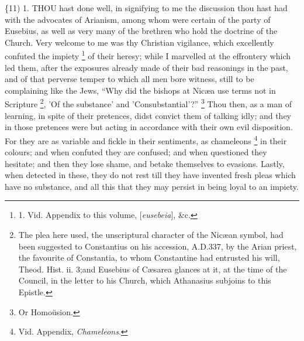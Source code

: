 \{11) 1. THOU
hast done well, in signifying to me the discussion thou hast had with
the advocates of Arianism, among whom were certain of the party of
Eusebius, as well as very many of the brethren who hold the doctrine
of the Church. Very welcome to me was thy Christian vigilance, which
excellently confuted the impiety \footnote{

1. Vid. Appendix to this
volume, [\emph{eusebeia}], \&c.} of their heresy; while I marvelled at the effrontery which led
them, after the exposures already made of their bad reasonings in the
past, and of that perverse temper to which all men bore witness, still
to be complaining like the Jews, ``Why did the bishops at Nicæa use
terms not in Scripture \footnote{The plea here used, the unscriptural character of the Nicæan symbol,
had been suggested to Constantius on his accession, A.D.\emph{}337, by the Arian priest, the
favourite of Constantia, to whom Constantine had entrusted his will,
Theod. Hist. ii. 3;\emph{}and Eusebius of Cæsarea glances at it, at
the time of the Council, in the letter to his Church, which Athanasius
subjoins to this Epistle.},
'Of the substance' and 'Consubstantial'?'' \footnote{Or Homoüsion.} Thou then, as a man of learning, in spite of their pretences,
didst convict them of talking idly; and they in those pretences were
but acting in accordance with their own evil disposition. For
they are as variable and fickle in their sentiments, as chameleons \footnote{Vid. Appendix, \emph{Chameleons}.} in their colours; and when confuted they are confused; and when
questioned they hesitate; and then they lose shame, and betake
themselves to evasions. Lastly, when detected in these, they do not
rest till they have invented fresh pleas which have no substance, and
all this that they may persist in being loyal to an impiety.

